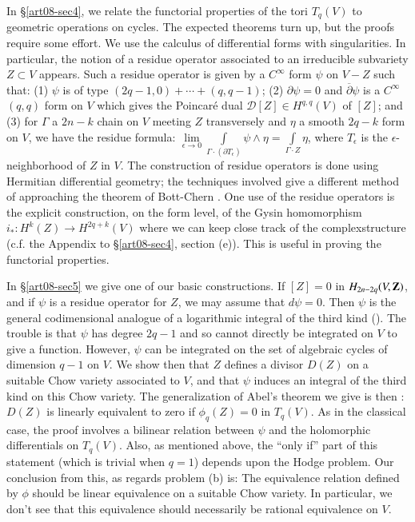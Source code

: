 In \S\ref{art08-sec4}, we relate the functorial properties of the tori $T_{q}(V)$ to geometric operations on cycles. The expected theorems turn up, but the proofs require some effort. We use the calculus of differential forms with singularities. In particular, the notion of a residue operator associated to an irreducible subvariety $Z\subset V$ appears. Such a residue operator is given by a $C^{\infty}$ form $\psi$ on $V-Z$ such that: (1) $\psi$ is of type $(2q-1,0)+\cdots+(q,q-1)$; (2) $\partial \psi=0$ and $\overline{\partial}\psi$ is a $C^{\infty}$ $(q,q)$ form on $V$ which gives the Poincar\'e dual $\mathscr{D}[Z]\in H^{q,q}(V)$ of $[Z]$; and (3) for $\Gamma$ a $2n-k$ chain on $V$ meeting $Z$ transversely and $\eta$ a smooth $2q-k$ form on $V$, we have the residue formula: $\lim\limits_{\epsilon\to 0} \int\limits_{\Gamma\cdot (\partial T_{\epsilon})}\psi \wedge \eta=\int\limits_{\Gamma\cdot Z}\eta$, where $T_{\epsilon}$ is the $\epsilon$-neighborhood of $Z$ in $V$. The construction of residue operators is done using Hermitian differential geometry; the techniques involved give a different method of approaching the theorem of Bott-Chern \cite{art08-key4}. One use of the residue operators is the explicit construction, on the form level, of the Gysin homomorphism $i_{*}:H^{k}(Z)\to H^{2q+k}(V)$ where we can keep close track of the complex\pageoriginale structure (c.f. the Appendix to \S\ref{art08-sec4}, section (e)). This is useful in proving the functorial properties.

In \S\ref{art08-sec5} we give one of our basic constructions. If $[Z]=0$ in $H_{2n-2q}\break (V,\bfZ)$, and if $\psi$ is a residue operator for $Z$, we may assume that $d\psi=0$. Then $\psi$ is the general codimensional analogue of a logarithmic integral of the third kind (\cite{art08-key17}). The trouble is that $\psi$ has degree $2q-1$ and so cannot directly be integrated on $V$ to give a function. However, $\psi$ can be integrated on the set of algebraic cycles of dimension $q-1$ on $V$. We show then that $Z$ defines a divisor $D(Z)$ on a suitable Chow variety associated to $V$, and that $\psi$ induces an integral of the third kind on this Chow variety. The generalization of Abel's theorem we give is then : $D(Z)$ is linearly equivalent to zero if $\phi_{q}(Z)=0$ in $T_{q}(V)$. As in the classical case, the proof involves a bilinear relation between $\psi$ and the holomorphic differentials on $T_{q}(V)$. Also, as mentioned above, the ``only if'' part of this statement (which is trivial when $q=1$) depends upon the Hodge problem. Our conclusion from this, as regards problem (b) is: The equivalence relation defined by $\phi$ should be linear equivalence on a suitable Chow variety. In particular, we don't see that this equivalence should necessarily be rational equivalence on $V$.

